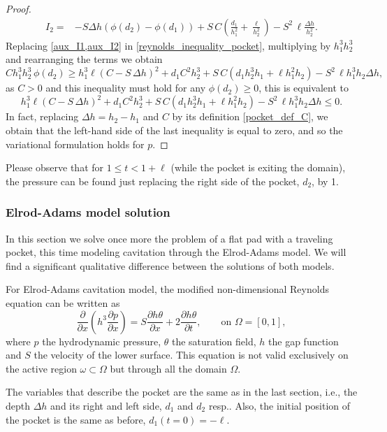 \begin{proposition}
\begin{proof}
\begin{align}
I_2=&-S\Delta h\left(\phi(d_2)-\phi(d_1)\right)+S\,C\left(\frac{d_1}{h_1^2}+\frac{\ell}{h_2^2}\right)-S^2\,\ell\frac{\Delta h}{h_2^2}.\label{eq:aux_I2}
\end{align}
Replacing \eqref{aux_I1,aux_I2} in \eqref{reynolds_inequality_pocket}, multiplying by $h_1^3h_2^3$ and rearranging the terms we obtain
$$Ch_1^3h_2^3\,\phi(d_2)\geq h_1^3\ell\left(C-S\,\Delta h\right)^2+d_1C^2h_2^3+S\,C\left(d_1h_2^3h_1+\ell h_1^2h_2\right)-S^2\,\ell h_1^3h_2 \Delta h,$$
as $C>0$ and this inequality must hold for any $\phi(d_2)\geq 0$, this is equivalent to
$$h_1^3\ell\left(C-S\,\Delta h\right)^2+d_1C^2h_2^3+S\,C\left(d_1h_2^3h_1+\ell h_1^2h_2\right)-S^2\,\ell h_1^3h_2 \Delta h \leq 0.$$
In fact, replacing $\Delta h=h_2-h_1$ and $C$ by its definition \eqref*{pocket_def_C}, we obtain that the left-hand side of the last inequality is equal to zero, and so the variational formulation holds for $p$.
\end{proof}
\end{proposition}
Please observe that for $1 \leq  t <1 +\ell$ (while the pocket is exiting the domain), the pressure can be found just replacing the right side of the pocket, $d_2$, by 1.
\subsubsection*{Elrod-Adams model solution}
In this section we solve once more the problem of a flat pad with a traveling pocket, this time modeling cavitation through the Elrod-Adams model. We will find a significant qualitative difference between the solutions of both models.

For Elrod-Adams cavitation model, the modified non-dimensional Reynolds equation can be written as
\begin{equation}
\frac{\partial}{\partial x}\left( h^3 \frac{\partial p}{\partial x} \right)=S\frac{\partial h\theta}{\partial x}+2\frac{\partial h\theta}{\partial t},\qquad \text{on }\Omega=[0,1],\label{eq:pocket_reynoldstheta}
\end{equation}
where $p$ the hydrodynamic pressure, $\theta$ the saturation field, $h$ the gap function and $S$ the velocity of the lower surface. This equation is not valid exclusively on the active region $\omega\subset\Omega$ but through all the domain $\Omega$.

The variables that describe the pocket are the same as in the last section, i.e., the depth $\Delta h$ and its right and left side, $d_1$ and $d_2$ resp.. Also, the initial position of the pocket is the same as before, $d_1(t=0)=-\ell$.

